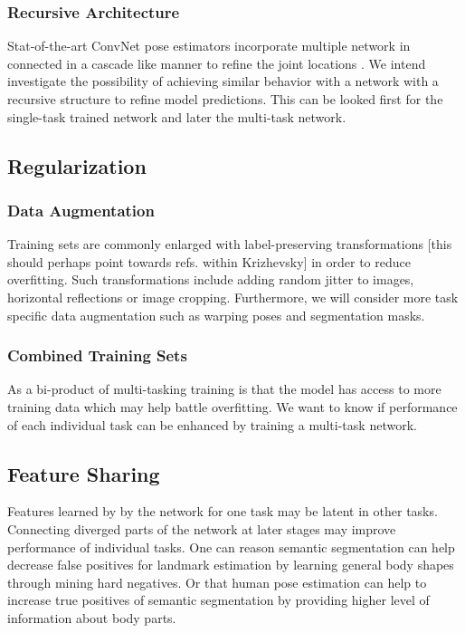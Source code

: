 \documentclass[a4paper,10pt]{article}
\begin{document}
\subsubsection{Recursive Architecture}
\label{sec:arc:recursive}
Stat-of-the-art ConvNet pose estimators incorporate multiple network in connected in a cascade like manner  to refine the joint locations \cite{Tompson2015,Wei2016}.  We intend investigate the possibility of achieving similar behavior with a network with a recursive structure to refine model predictions.  This can be looked first for the single-task trained network and later the multi-task network.


\subsection{Regularization}
\label{sec:reg}
\subsubsection{Data Augmentation}
\label{sec:reg:augmentation}
Training sets are commonly enlarged with label-preserving transformations \cite{Krizhevsky2012}[this should perhaps point towards refs. within Krizhevsky] in order to reduce overfitting. Such transformations include adding random jitter to images, horizontal reflections or image cropping.  Furthermore, we will consider more task specific data augmentation such as warping poses and segmentation masks.

\subsubsection{Combined Training Sets}
\label{sec:reg:combined}
As a bi-product of multi-tasking training is that the model has access to more training data which may help battle overfitting.  We want to know if performance of each individual task can be enhanced by training a multi-task network.  

\subsection{Feature Sharing}
Features learned by by the network for one task may be latent in other tasks.  Connecting diverged parts of the network at later stages may improve performance of individual tasks.  One can reason semantic segmentation can help decrease false positives for landmark estimation by learning general body shapes through mining hard negatives.  Or that human pose estimation can help to increase true positives of semantic segmentation by providing higher level of information about body parts.
\end{document}
